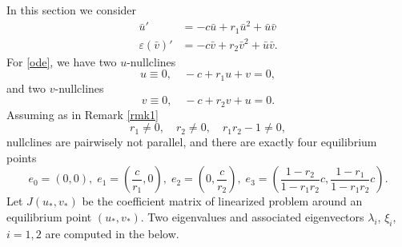 \documentclass{amsart}
\theoremstyle{definition}
\numberwithin{equation}{section}
\begin{document}
In this section we consider 
\begin{equation}\label{ode}
\begin{aligned}
\bar{u}' &= -c\bar{u} + r_{1}\bar{u}^{2} + \bar{u}  \bar{v}   \\
\varepsilon(\bar{v})' &=-c\bar{v} + r_{2}\bar{v}^{2} + \bar{u}  \bar{v}.
\end{aligned}
\end{equation}
For \eqref{ode}, we have two $u$-nullclines 
$$u\equiv0, \quad -c + r_1 u + v = 0,$$
and two $v$-nullclines 
$$v\equiv0, \quad -c + r_2 v + u = 0.$$
Assuming as in Remark \ref{rmk1}
\begin{equation} \label{notborderline}
 r_1 \ne 0, \quad r_2\ne0, \quad r_1r_2-1 \ne 0,
\end{equation}
nullclines are pairwisely not parallel, and there are exactly four equilibrium points
\begin{equation*}
e_{0} = (0,0), \; e_{1} = \left( \frac{c}{r_{1}}, 0 \right), \;
e_{2} = \left( 0, \frac{c}{r_{2}} \right), \;
e_{3}= \left( \frac{1-r_{2}}{1-r_{1}r_{2}}c,
\frac{1-r_{1}}{1-r_{1}r_{2}}c\right) .
\end{equation*}
Let $J(u_*,v_*)$ be the coefficient matrix of linearized problem around an equilibrium point $(u_*,v_*)$. Two eigenvalues and associated eigenvectors $\lambda_i$, $\xi_i$, $i=1,2$ are computed in the below.
\end{document}
